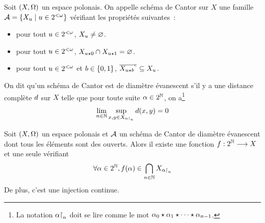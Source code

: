 \begin{definition}
  Soit $(X,\Omega)$ un espace polonais. On appelle schéma de Cantor sur $X$ une
  famille $\mathcal A=\left\{ X_u \;\middle\vert\; u\in 2^{<\omega} \right\}$ vérifiant les propriétés
  suivantes~:
  \begin{itemize}
  \item pour tout $u \in 2^{<\omega}$, $X_u \neq \varnothing$.
  \item pour tout $u\in 2^{<\omega}$,
    $X_{u\mathbin{\star} 0}\cap X_{u\mathbin{\star} 1} = \varnothing$.
  \item pour tout $u \in 2^{<\omega}$ et $b \in \{0,1\}$,
    $\overline{X_{u\mathbin{\star} b}}^{\mathrm c}\subseteq X_u$.
  \end{itemize}

  On dit qu'un schéma de Cantor est de diamètre évanescent s'il y a une distance
  complète $d$ sur $X$ telle que pour toute suite $\alpha\in 2^{\mathbb N}$, on
  a\footnote{La notation $\alpha\mathbin{\upharpoonright}_{n}$ doit se lire comme le mot
  $\alpha_0\mathbin{\star}\alpha_1\mathbin{\star}\cdots\mathbin{\star}\alpha_{n-1}$.}
  \[\lim_{n\in\mathbb N} \sup_{x,y\in X_{\alpha\mathbin{\upharpoonright}_{n}}}d(x,y) = 0\]
\end{definition}

\begin{proposition}\label{desc.prop.schem.C}
  Soit $(X,\Omega)$ un espace polonais et $\mathcal A$ un schéma de Cantor de
  diamètre évanescent dont tous les éléments sont des ouverts. Alors il existe
  une fonction $f : \displaystyle 2^{\mathbb N} \longrightarrow X$ et une seule vérifiant
  \[\forall \alpha \in 2^{\mathbb N},
  f(\alpha) \in \bigcap_{n \in \mathbb N}X_{\alpha\mathbin{\upharpoonright}_{n}}\]
  De plus, c'est une injection continue.
\end{proposition}

